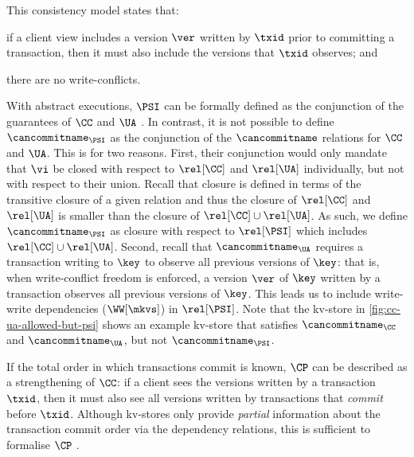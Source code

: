 This consistency model states that: 
\begin{enumerate*}
	\item if a client view includes a version \(\ver\) written by \( \txid \) prior to committing a transaction, 
then it must also include the versions that \(\txid\) observes; and
	\item there are no write-conflicts.
\end{enumerate*}
With abstract executions,  \(\PSI\) can be formally defined as the conjunction of
the guarantees of \(\CC\) and \(\UA\) \cite{framework-concur}. In
contrast, it is not possible to define \(\cancommitname_{\PSI}\) as
the conjunction of the \(\cancommitname\) relations for \(\CC\) and
\(\UA\). 
This is for two reasons.  
First, their conjunction would only mandate that \(\vi\) be closed with respect to 
\(\rel[\CC]\) and \(\rel[\UA]\) {individually}, but {not} with respect to their {union}.
Recall that closure is defined in terms of the transitive closure of a given relation 
and thus the closure of \(\rel[\CC]\) and \(\rel[\UA]\) is smaller than the closure of \(\rel[\CC] \cup \rel[\UA]\).
As such, we define \(\cancommitname_{\PSI}\) as closure with respect to \(\rel[\PSI] \) which includes \( \rel[\CC] \cup \rel[\UA]\).
Second, recall that \(\cancommitname_{\UA}\) requires a transaction writing 
to \(\key\) to observe all previous versions of \(\key\):
that is, when write-conflict freedom is enforced, a version \(\ver\) of \( \key \)
written by a transaction observes all previous versions of \(\key\). 
This leads us to include write-write dependencies (\(\WW[\mkvs]\)) in \(\rel[\PSI]\). 
Note that the kv-store in \cref{fig:cc-ua-allowed-but-psi} shows an
example kv-store that satisfies \(\cancommitname_{\CC} \) and \( \cancommitname_{\UA}\), 
but not \(\cancommitname_{\PSI}\).  



\label{para:cp}
If the total order in which transactions commit is known, \(\CP\)
can be described as a strengthening of \(\CC\): 
if a client sees the versions written by a transaction \(\txid\),
then it must also see all versions written by transactions that \emph{commit} before \(\txid\). 
Although kv-stores only provide \emph{partial} information about the transaction commit order via the dependency relations,
this is sufficient to formalise $\CP$ \cite{laws}.

